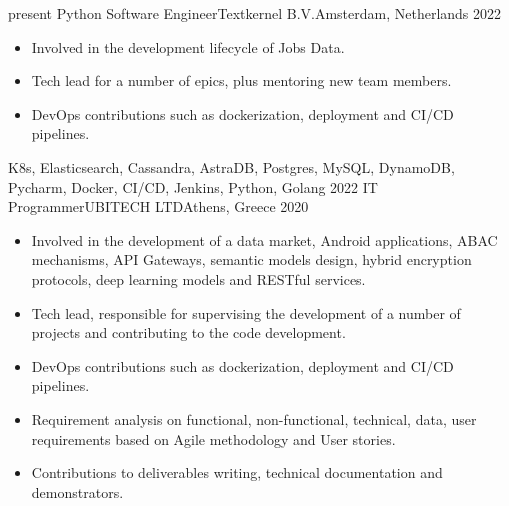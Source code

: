 \begin{experiences}
\experience
    {present}   {Python Software Engineer}{Textkernel B.V.}{Amsterdam, Netherlands}
    {2022} {
                    \begin{itemize}
                    
                        \item Involved in the development lifecycle of Jobs Data.
                        
                        \item Tech lead for a number of epics, plus mentoring new team members.
                                                        
                        \item DevOps contributions such as dockerization, deployment and CI/CD pipelines.

                    \end{itemize}
                    }
                    {K8s, Elasticsearch, Cassandra, AstraDB, Postgres, MySQL, DynamoDB, Pycharm, Docker, CI/CD, Jenkins, Python, Golang}
\emptySeparator
\experience
    {2022}   {IT Programmer}{UBITECH LTD}{Athens, Greece}
    {2020} {
                    \begin{itemize}
                    
                        \item Involved in the development of a data market, Android applications, ABAC mechanisms, API Gateways,
                                                        semantic models design, hybrid encryption protocols, deep learning models and RESTful services.
                                                        
                        \item Tech lead, responsible for supervising the development of a number of projects and contributing to the code development.
                        
                        \item DevOps contributions such as dockerization, deployment and CI/CD pipelines.

                        \item Requirement analysis on functional, non-functional, technical, data, user requirements based on Agile methodology and User stories.
                        
                        \item Contributions to deliverables writing, technical documentation and demonstrators.
                        

\end{itemize}}
\end{experiences}
